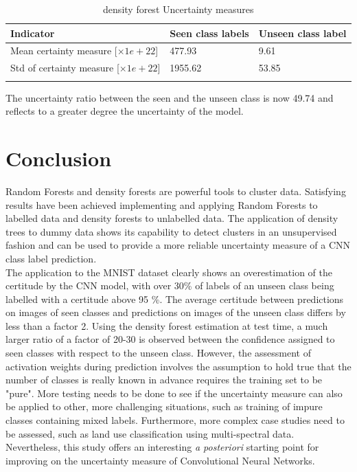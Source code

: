 \documentclass{article}
\begin{document}
\begin{table}[H]
    \centering
    \begin{tabular}{lll}\toprule
    Indicator & Seen class labels & Unseen class label \\\hline
    Mean certainty measure [$\times 1e+22$] & 477.93 & 9.61\\
    Std of certainty measure [$\times 1e+22$] & 1955.62 & 53.85 \\
    \\ \bottomrule
    \end{tabular}
    \caption{density forest Uncertainty measures}
    \label{table:density-forest-accuracy}
\end{table}

The uncertainty ratio between the seen and the unseen class is now 49.74 and reflects to a greater degree the uncertainty of the model.

\section{Conclusion}
Random Forests and density forests are powerful tools to cluster data. Satisfying results have been achieved implementing and applying Random Forests to labelled data and density forests to unlabelled data. The application of density trees to dummy data shows its capability to detect clusters in an unsupervised fashion and can be used to provide a more reliable uncertainty measure of a CNN class label prediction.\\

The application to the MNIST dataset clearly shows an overestimation of the certitude by the CNN model, with over 30\% of labels of an unseen class being labelled with a certitude above 95 \%. The average certitude between predictions on images of seen classes and predictions on images of the unseen class differs by less than a factor 2. Using the density forest estimation at test time, a much larger ratio of a factor of 20-30 is observed between the confidence assigned to seen classes with respect to the unseen class. However, the assessment of activation weights during prediction involves the assumption to hold true that the number of classes is really known in advance requires the training set to be "pure". More testing needs to be done to see if the uncertainty measure can also be applied to other, more challenging situations, such as training of impure classes containing mixed labels. Furthermore, more complex case studies need to be assessed, such as land use classification using multi-spectral data. Nevertheless, this study offers an interesting \textit{a posteriori} starting point for improving on the uncertainty measure of Convolutional Neural Networks.
\end{document}
